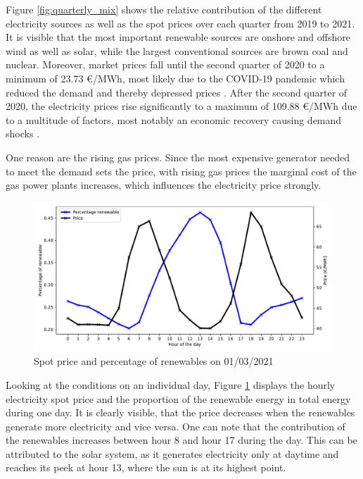 \documentclass{article}
\begin{document}
Figure \ref{fig:quarterly_mix} shows the relative contribution of the different electricity sources as well as the spot prices over each quarter from 2019 to 2021.
It is visible that the most important renewable sources are onshore and offshore wind as well as solar, while the largest conventional sources are brown coal and nuclear.
Moreover, market prices fall until the second quarter of 2020 to a minimum of 23.73 €/MWh, most likely due to the COVID-19 pandemic which reduced the demand and thereby depressed prices \citep{covid_electricity_systems}.
After the second quarter of 2020, the electricity prices rise significantly to a maximum of 109.88 €/MWh due to a multitude of factors, most notably an economic recovery causing demand shocks \citep{long_covid_energy_prices}.


One reason are the rising gas prices. Since the most expensive generator needed to meet the demand sets the price, with rising gas prices the marginal cost of the gas power plants increases, which influences the electricity price strongly. 

\begin{figure}[h]
    \centering
    \includegraphics[width=0.8\columnwidth]{doc/fig/example_day.pdf}
    \caption{Spot price and percentage of renewables on 01/03/2021}
    \label{fig:example_day}
\end{figure}

Looking at the conditions on an individual day, Figure \ref{fig:example_day} displays the hourly electricity spot price and the proportion of the renewable energy in total energy during one day. 
It is clearly visible, that the price decreases when the renewables generate more electricity and vice versa. 
One can note that the contribution of the renewables increases between hour 8 and hour 17 during the day. 
This can be attributed to the solar system, as it generates electricity only at daytime and reaches its peek at hour 13, where the sun is at its highest point. 
\end{document}
